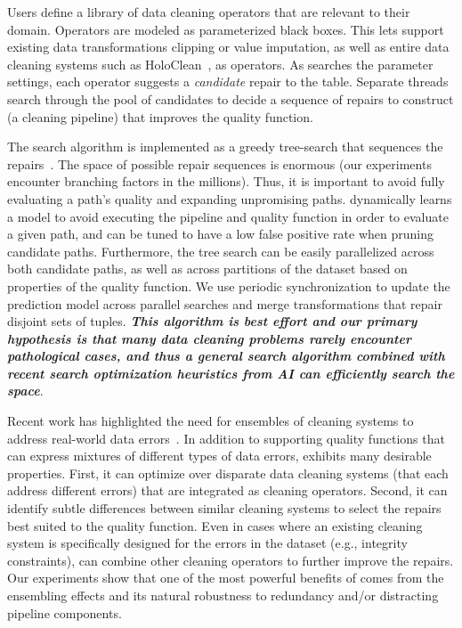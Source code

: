Users define a library of data cleaning operators that are relevant to their domain.  Operators are modeled as parameterized black boxes.  This lets \sys support existing data transformations clipping or value imputation, as well as entire data cleaning systems such as HoloClean~\cite{rekatsinas2017holoclean}, as operators.
As \sys searches the parameter settings, each operator suggests a \emph{candidate} repair to the table.
Separate threads search through the pool of candidates to decide a sequence of repairs to construct (a cleaning pipeline) that improves the quality function.

The search algorithm is implemented as a greedy tree-search that sequences the repairs~\cite{russell2016artificial}.
The space of possible repair sequences is enormous (our experiments encounter branching factors in the millions).
Thus, it is important to avoid fully evaluating a path's quality and expanding unpromising paths.    
\sys dynamically learns a model to avoid executing the pipeline and quality function in order to evaluate a given path, and can be tuned to have a low false positive rate when pruning candidate paths.  
Furthermore, the tree search can be easily parallelized across both candidate paths, as well as across partitions of the dataset based on properties of the quality function.
We use periodic synchronization to update the prediction model across parallel searches and merge transformations that repair disjoint sets of tuples. 
\textbf{\emph{This algorithm is best effort and our primary hypothesis is that many data cleaning problems rarely encounter pathological cases, and thus a general search algorithm combined with recent search optimization heuristics from AI can efficiently search the space}}.

Recent work has highlighted the need for ensembles of cleaning systems to address real-world data errors~\cite{DBLP:journals/pvldb/AbedjanCDFIOPST16}.  In addition to supporting quality functions that can express mixtures of different types of data errors, \sys exhibits many desirable properties.
First, it can optimize over disparate data cleaning systems (that each address different errors) that are integrated as \sys cleaning operators.  Second, it can identify subtle differences between similar cleaning systems to select the repairs best suited to the quality function.  Even in cases where an existing cleaning system is specifically designed for the errors in the dataset (e.g., integrity constraints), \sys can combine other cleaning operators to further improve the repairs.  Our experiments show that one of the most powerful benefits of \sys comes from the ensembling effects and its natural robustness to redundancy and/or distracting pipeline components.

